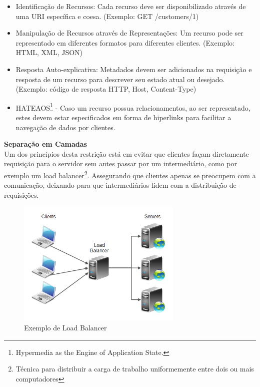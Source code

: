 \begin{itemize}[noitemsep]
\item Identificação de Recursos: Cada recurso deve ser disponibilizado através de uma URI específica e coesa. (Exemplo: GET /customers/1)
\item Manipulação de Recursos através de Representações: Um recurso pode ser representado em diferentes formatos para diferentes clientes. (Exemplo: HTML, XML, JSON)
\item Resposta Auto-explicativa: Metadados devem ser adicionados na requisição e resposta de um recurso para descrever seu estado atual ou desejado. (Exemplo: código de resposta HTTP, Host, Content-Type)
\item HATEAOS\footnote{
  Hypermedia as the Engine of Application State.
} - Caso um recurso possua relacionamentos, ao ser representado, estes devem estar especificados em forma de hiperlinks para facilitar a navegação de dados por clientes.
\end{itemize}

\textbf{Separação em Camadas} \\

Um dos princípios desta restrição está em evitar que clientes façam diretamente requisição para o servidor sem antes passar por um intermediário, como por exemplo um load balancer\footnote{
  Técnica para distribuir a carga de trabalho uniformemente entre dois ou mais computadores
}. Assegurando que clientes apenas se preocupem com a comunicação, deixando para que intermediários lidem com a distribuição de requisições. \cite{Fielding2000}

\begin{figure}[H]
  \centering  	   \includegraphics[width=0.7\textwidth,height=\textheight,keepaspectratio]{figuras/load-balancer.png}
  \caption{Exemplo de Load Balancer}
\end{figure}

